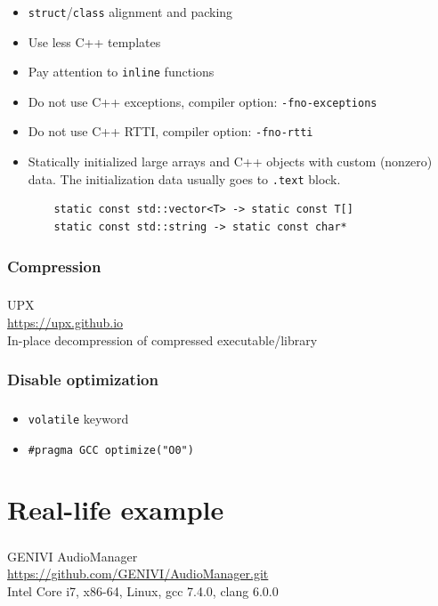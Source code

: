 \documentclass{beamer}
\newcommand{\codeinline}[1] {\texttt{\small #1}}
\begin{document}
\begin{frame}[fragile]
\frametitle{\subsubsecname}
\begin{itemize}
    \item \codeinline{struct}/\codeinline{class} alignment and packing
    \item Use less C++ templates
    \item Pay attention to \codeinline{inline} functions
    \item Do not use C++ exceptions, compiler option: \codeinline{-fno-exceptions}
    \item Do not use C++ RTTI, compiler option: \codeinline{-fno-rtti}
    \item Statically initialized large arrays and C++ objects with custom (nonzero) data. The initialization data usually goes to \codeinline{.text} block. 
    \small
\begin{verbatim}
    static const std::vector<T> -> static const T[]
    static const std::string -> static const char*
\end{verbatim}
\normalsize
\end{itemize}
\end{frame}

\subsubsection{Compression}

\begin{frame}
\frametitle{\subsubsecname}
\center
\Large UPX \normalsize \\
\url{https://upx.github.io} \\
In-place decompression of compressed executable/library
\end{frame}

\subsubsection{Disable optimization}

\begin{frame}
\frametitle{\subsubsecname}
\begin{itemize}
	\item \codeinline{volatile} keyword
	\item \codeinline{\#pragma GCC optimize("O0")}
\end{itemize}
\end{frame}

\section{Real-life example}
\begin{frame}
\frametitle{\secname}
\center
GENIVI AudioManager \\
\url{https://github.com/GENIVI/AudioManager.git} \\
Intel Core i7, x86-64, Linux, gcc 7.4.0, clang 6.0.0

\end{frame}
\end{document}
